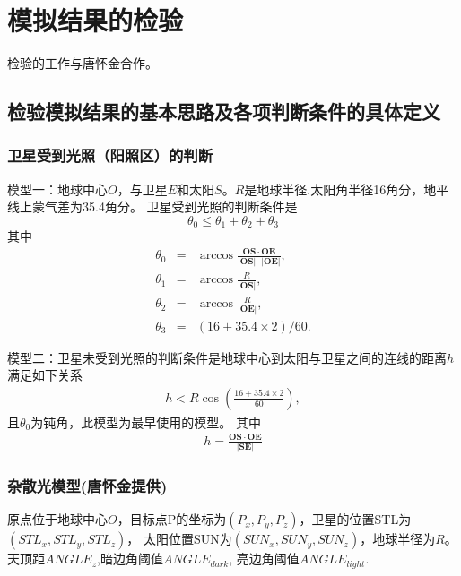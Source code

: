 
\chapter{模拟结果的检验}

{\heiti 检验的工作与唐怀金合作。}


\section{检验模拟结果的基本思路及各项判断条件的具体定义}


\subsection{卫星受到光照（阳照区）的判断}

模型一：地球中心$O$，与卫星$E$和太阳$S$。$R$是地球半径.太阳角半径16角分，地平线上蒙气差为35.4角分。
卫星受到光照的判断条件是 
\begin{equation}
\theta_0 \le \theta_1+ \theta_2+ \theta_3
\end{equation}
其中
\begin{eqnarray}
\theta_0 &=& \arccos \frac{\bm{OS} \cdot \bm{OE}}{|\bm{OS}| \cdot |\bm{OE}|},\\
\theta_1 &=& \arccos{\frac{R}{|\bm{OS}|}},\\
\theta_2 &=& \arccos{\frac{R}{|\bm{OE}|}},\\
\theta_3 &=& (16+35.4\times 2)/60.
\end{eqnarray}
 
模型二：卫星未受到光照的判断条件是地球中心到太阳与卫星之间的连线的距离$h$满足如下关系
\begin{eqnarray}
h < R \cos\left( \frac{16+35.4\times2}{60} \right),
\end{eqnarray}
且$\theta_0$为钝角，此模型为最早使用的模型。 其中 
\begin{eqnarray}
h=\frac{\bm{OS} \cdot \bm{OE}}{|\bm{SE}|}
\end{eqnarray}

\subsection{杂散光模型(唐怀金提供)}
原点位于地球中心$O$，目标点P的坐标为$(P_x,P_y,P_z)$，卫星的位置STL为$(STL_x,STL_y,STL_z)$，
太阳位置SUN为$(SUN_x,SUN_y,SUN_z)$，地球半径为$R$。天顶距$ANGLE_z$,暗边角阈值$ANGLE_{dark}$,
亮边角阈值$ANGLE_{light}$.

